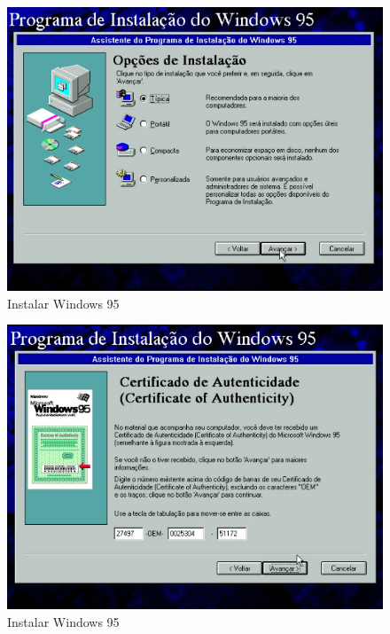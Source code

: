 \documentclass{report}
\begin{document}
\begin{figure}
\centering
\includegraphics[width=\textwidth]{Screenshot_34.png}
\caption{Instalar Windows 95}
\label{fig:34}
\end{figure}

\begin{figure}
\centering
\includegraphics[width=\textwidth]{Screenshot_35.png}
\caption{Instalar Windows 95}
\label{fig:35}
\end{figure}
\end{document}

